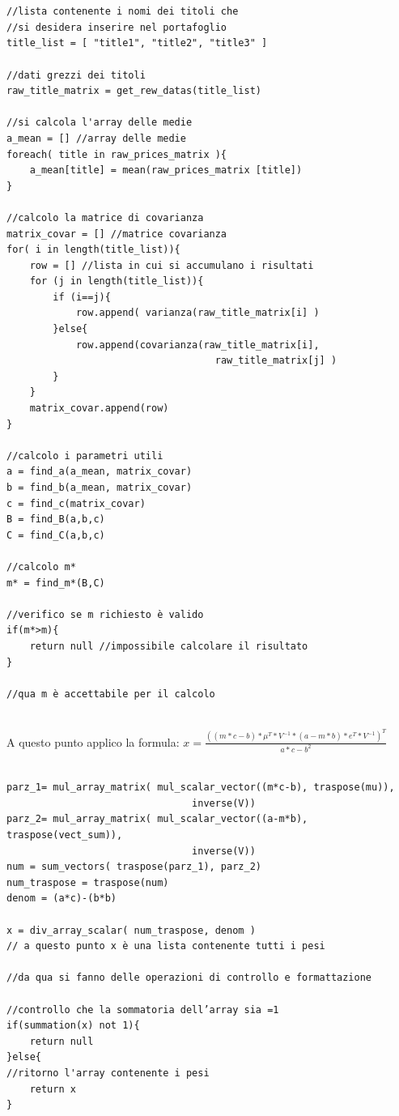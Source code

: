 \begin{verbatim}


//lista contenente i nomi dei titoli che 
//si desidera inserire nel portafoglio
title_list = [ "title1", "title2", "title3" ] 

//dati grezzi dei titoli
raw_title_matrix = get_rew_datas(title_list)

//si calcola l'array delle medie
a_mean = [] //array delle medie
foreach( title in raw_prices_matrix ){
	a_mean[title] = mean(raw_prices_matrix [title])
}

//calcolo la matrice di covarianza
matrix_covar = [] //matrice covarianza
for( i in length(title_list)){
	row = [] //lista in cui si accumulano i risultati
	for (j in length(title_list)){
		if (i==j){
			row.append( varianza(raw_title_matrix[i] )
		}else{
			row.append(covarianza(raw_title_matrix[i],
			                        raw_title_matrix[j] )
		}	
	}
	matrix_covar.append(row)
}

//calcolo i parametri utili
a = find_a(a_mean, matrix_covar)
b = find_b(a_mean, matrix_covar)
c = find_c(matrix_covar)
B = find_B(a,b,c)
C = find_C(a,b,c)

//calcolo m*
m* = find_m*(B,C)

//verifico se m richiesto è valido
if(m*>m){
	return null //impossibile calcolare il risultato
}

//qua m è accettabile per il calcolo
 
\end{verbatim}
 \begin{Nota}
 A questo punto applico la formula: $x = \frac{((m*c-b) * \mu^T * V^{-1} * (a-m*b)*e^T*V^{-1})^T}{ a*c-b^2 }$
 \end{Nota}
\begin{verbatim}

parz_1= mul_array_matrix( mul_scalar_vector((m*c-b), traspose(mu)),
                                inverse(V))
parz_2= mul_array_matrix( mul_scalar_vector((a-m*b), traspose(vect_sum)),
                                inverse(V))  
num = sum_vectors( traspose(parz_1), parz_2)
num_traspose = traspose(num) 
denom = (a*c)-(b*b) 

x = div_array_scalar( num_traspose, denom )
// a questo punto x è una lista contenente tutti i pesi

//da qua si fanno delle operazioni di controllo e formattazione

//controllo che la sommatoria dell’array sia =1
if(summation(x) not 1){
    return null
}else{
//ritorno l'array contenente i pesi
    return x
}
    
\end{verbatim}

